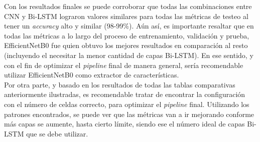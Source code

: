 Con los resultados finales se puede corroborar que todas las 
combinaciones entre CNN y Bi-LSTM lograron valores similares para 
todas las métricas de testeo al tener un \textit{accuracy} alto y similar 
(98-99\%). Aún así, es importante resaltar que en todas las métricas a lo 
largo del proceso de entrenamiento, validación y prueba, EfficientNetB0 
fue quien obtuvo los mejores resultados en comparación al resto 
(incluyendo el necesitar la menor cantidad de capas Bi-LSTM). En ese 
sentido, y con el fin de optimizar el \textit{pipeline} final de 
manera general, sería recomendable utilizar EfficientNetB0 como extractor 
de características. \\

Por otra parte, y basado en los resultados de todas 
las tablas comparativas anteriormente ilustradas, es recomendable tratar 
de encontrar la configuración con el número de celdas correcto, para 
optimizar el \textit{pipeline} final. Utilizando los patrones 
encontrados, se puede ver que las métricas van a ir mejorando conforme 
más capas se aumente, hasta cierto límite, siendo ese el número ideal 
de capas Bi-LSTM que se debe utilizar.